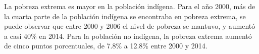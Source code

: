 La pobreza extrema es mayor en la población indígena. Para el año 2000, más de la cuarta parte de la población indígena se encontraba en pobreza extrema, se puede observar que entre 2000 y 2006 el nivel de pobreza se mantuvo, y aumentó a casi 40\% en 2014. Para la población no indígena, la pobreza extrema aumentó de cinco puntos porcentuales, de 7.8\% a 12.8\% entre 2000 y 2014.